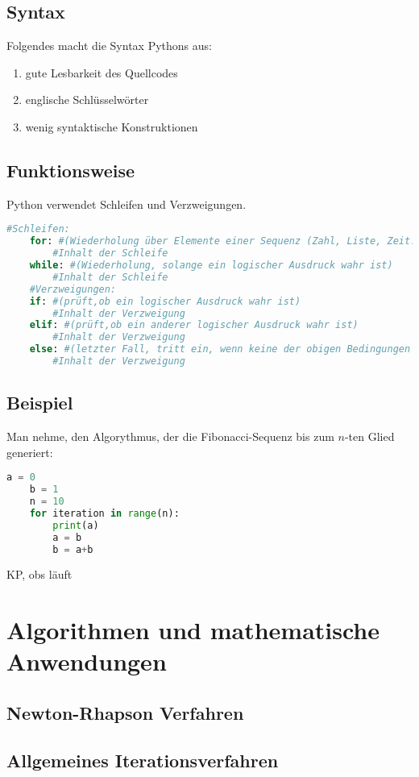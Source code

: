 \subsection{Syntax}
Folgendes macht die Syntax Pythons aus:\\
\begin{enumerate}
\item gute Lesbarkeit des Quellcodes\\
\item  englische Schlüsselwörter\\
\item wenig syntaktische Konstruktionen
\end{enumerate}
\subsection{Funktionsweise}
Python verwendet Schleifen und Verzweigungen.\\
\begin{lstlisting}[language=Python]
	#Schleifen:
	for: #(Wiederholung über Elemente einer Sequenz (Zahl, Liste, Zeit...))
		#Inhalt der Schleife
	while: #(Wiederholung, solange ein logischer Ausdruck wahr ist)
		#Inhalt der Schleife
	#Verzweigungen:
	if: #(prüft,ob ein logischer Ausdruck wahr ist)
		#Inhalt der Verzweigung
	elif: #(prüft,ob ein anderer logischer Ausdruck wahr ist)
		#Inhalt der Verzweigung
	else: #(letzter Fall, tritt ein, wenn keine der obigen Bedingungen erfüllt wurde)
		#Inhalt der Verzweigung
\end{lstlisting}
\subsection{Beispiel}
Man nehme, den Algorythmus, der die Fibonacci-Sequenz bis zum $n$-ten Glied generiert:\\
\begin{lstlisting}[language=Python]
	a = 0
	b = 1
	n = 10
	for iteration in range(n):
		print(a)
		a = b
		b = a+b
\end{lstlisting}
KP, obs läuft
\section{Algorithmen und mathematische Anwendungen}
\subsection{Newton-Rhapson Verfahren}
\subsection{Allgemeines Iterationsverfahren}

